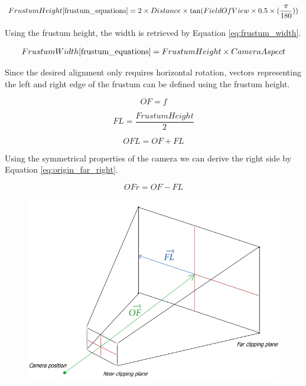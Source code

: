 \documentclass[a4paper,11pt]{article}
\begin{document}

\begin{align}
	Frustum Height\cite{frustum_equations} = 2 \times Distance \times \tan(Field Of View \times 0.5 \times (\frac{\pi}{180}))
    \label{eq:frustum_height}
\end{align}

Using the frustum height, the width is retrieved by Equation \ref{eq:frustum_width}.

\begin{align}
	Frustum Width\cite{frustum_equations} = Frustum Height \times Camera Aspect
    \label{eq:frustum_width}
\end{align}

Since the desired alignment only requires horizontal rotation, vectors representing the left and right edge of the frustum can be defined using the frustum height.

\begin{equation}
	OF = f
	\label{eq:origin_to_far}
\end{equation}

\begin{equation}
	FL =\frac{Frustum Height}{2}
    \label{eq:centre_to_left}
\end{equation}

\begin{equation}
	OFL = OF + FL
    \label{eq:origin_far_left}
\end{equation}

Using the symmetrical properties of the camera we can derive the right side by Equation \ref{eq:origin_far_right}.

\begin{equation}
	OFr = OF - FL
	\label{eq:origin_far_right}
\end{equation}

\begin{figure}[ht]
	\centering
	\includegraphics[scale=0.4]{images/frustum}
    \label{fig:frustum}
\end{figure}
\end{document}
